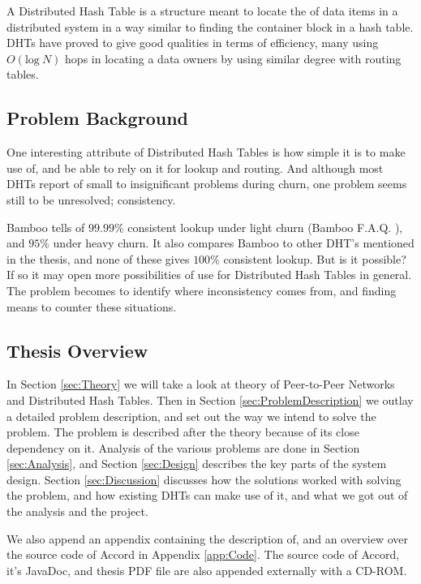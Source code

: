 A Distributed Hash Table is a structure meant to locate the  of data items
 in a distributed system in a way similar to finding the container block in
 a  hash table. DHTs have proved to give good qualities in
 terms of efficiency, many using $O(\mathrm{log\ }N)$ hops in
 locating a data owners by using similar degree with routing tables.

\subsection{Problem Background}
\label{problem:overview}

One interesting attribute of Distributed Hash Tables is how simple it is
 to make use of, and be able to rely on it for lookup and routing. And although
 most DHTs report of small to insignificant problems during churn, one problem
 seems still to be unresolved; consistency.

Bamboo tells of $99.99\%$ consistent lookup under light churn (Bamboo F.A.Q.
 \cite{bamboo-homepage}), and $95\%$ under heavy churn. It
 also compares Bamboo to other DHT's mentioned in the thesis, and none of these
 gives $100\%$ consistent lookup. But is it possible? If so it may open more
 possibilities of use for Distributed Hash Tables in general.
 The problem becomes to identify where inconsistency comes from, and finding means
 to counter these situations.

\subsection{Thesis Overview}

In Section \ref{sec:Theory} we will take a look at theory of Peer-to-Peer Networks
 and Distributed Hash Tables. Then in Section \ref{sec:ProblemDescription}
 we outlay
 a detailed problem description, and set out the way we intend to solve the
 problem. The problem is described after the theory because of its close dependency
 on it. Analysis of the various problems are done in Section
 \ref{sec:Analysis}, and
 Section \ref{sec:Design} describes the key parts of the system design. Section
 \ref{sec:Discussion} discusses how the solutions worked with solving the problem,
 and how existing DHTs can make use of it, and what we got out of the analysis and
 the project.

We also append an appendix containing the description of, and an overview over the
 source code of Accord in Appendix \ref{app:Code}. The source code of Accord, it's
 JavaDoc, and thesis PDF file
 are also appended externally with a CD-ROM.
